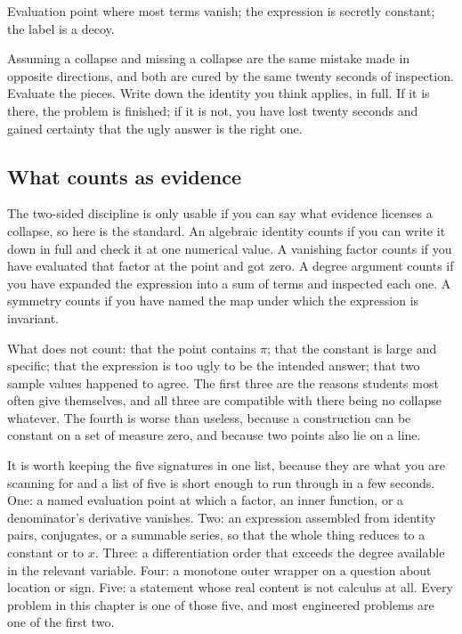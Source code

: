 \begin{seealsob}Evaluation point where most terms vanish; the expression is secretly constant; the label is a decoy.\end{seealsob}

\begin{keynote}
Assuming a collapse and missing a collapse are the same mistake made in opposite directions, and both are cured by the same twenty seconds of inspection. Evaluate the pieces. Write down the identity you think applies, in full. If it is there, the problem is finished; if it is not, you have lost twenty seconds and gained certainty that the ugly answer is the right one.
\end{keynote}

\subsection{What counts as evidence}

The two-sided discipline is only usable if you can say what evidence licenses a collapse, so here is the standard. An algebraic identity counts if you can write it down in full and check it at one numerical value. A vanishing factor counts if you have evaluated that factor at the point and got zero. A degree argument counts if you have expanded the expression into a sum of terms and inspected each one. A symmetry counts if you have named the map under which the expression is invariant.

What does not count: that the point contains $\pi$; that the constant is large and specific; that the expression is too ugly to be the intended answer; that two sample values happened to agree. The first three are the reasons students most often give themselves, and all three are compatible with there being no collapse whatever. The fourth is worse than useless, because a construction can be constant on a set of measure zero, and because two points also lie on a line.

It is worth keeping the five signatures in one list, because they are what you are scanning for and a list of five is short enough to run through in a few seconds. One: a named evaluation point at which a factor, an inner function, or a denominator's derivative vanishes. Two: an expression assembled from identity pairs, conjugates, or a summable series, so that the whole thing reduces to a constant or to $x$. Three: a differentiation order that exceeds the degree available in the relevant variable. Four: a monotone outer wrapper on a question about location or sign. Five: a statement whose real content is not calculus at all. Every problem in this chapter is one of those five, and most engineered problems are one of the first two.

